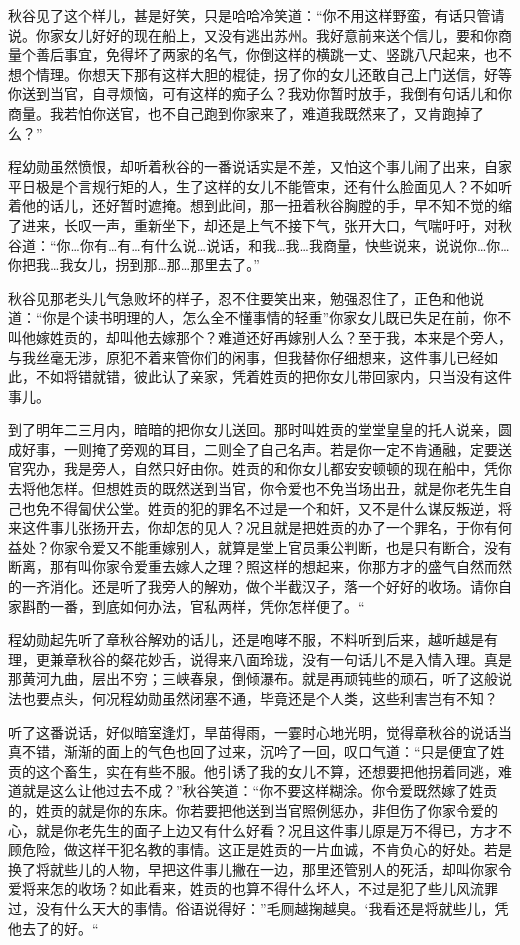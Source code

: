 \documentclass[12pt,UTF8]{ctexbook}
\begin{document}
{{{秋谷见了这个样儿，甚是好笑，只是哈哈冷笑道：“你不用这样野蛮，有话只管请说。你家女儿好好的现在船上，又没有逃出苏州。我好意前来送个信儿，要和你商量个善后事宜，免得坏了两家的名气，你倒这样的横跳一丈、竖跳八尺起来，也不想个情理。你想天下那有这样大胆的棍徒，拐了你的女儿还敢自己上门送信，好等你送到当官，自寻烦恼，可有这样的痴子么？我劝你暂时放手，我倒有句话儿和你商量。我若怕你送官，也不自己跑到你家来了，难道我既然来了，又肯跑掉了么？”

程幼勋虽然愤恨，却听着秋谷的一番说话实是不差，又怕这个事儿闹了出来，自家平日极是个言规行矩的人，生了这样的女儿不能管束，还有什么脸面见人？不如听着他的话儿，还好暂时遮掩。想到此间，那一扭着秋谷胸膛的手，早不知不觉的缩了进来，长叹一声，重新坐下，却还是上气不接下气，张开大口，气喘吁吁，对秋谷道：“你…你有…有…有什么说…说话，和我…我…我商量，快些说来，说说你…你…你把我…我女儿，拐到那…那…那里去了。”

秋谷见那老头儿气急败坏的样子，忍不住要笑出来，勉强忍住了，正色和他说道：“你是个读书明理的人，怎么全不懂事情的轻重”你家女儿既已失足在前，你不叫他嫁姓贡的，却叫他去嫁那个？难道还好再嫁别人么？至于我，本来是个旁人，与我丝毫无涉，原犯不着来管你们的闲事，但我替你仔细想来，这件事儿已经如此，不如将错就错，彼此认了亲家，凭着姓贡的把你女儿带回家内，只当没有这件事儿。

到了明年二三月内，暗暗的把你女儿送回。那时叫姓贡的堂堂皇皇的托人说亲，圆成好事，一则掩了旁观的耳目，二则全了自己名声。若是你一定不肯通融，定要送官究办，我是旁人，自然只好由你。姓贡的和你女儿都安安顿顿的现在船中，凭你去将他怎样。但想姓贡的既然送到当官，你令爱也不免当场出丑，就是你老先生自己也免不得匐伏公堂。姓贡的犯的罪名不过是一个和奸，又不是什么谋反叛逆，将来这件事儿张扬开去，你却怎的见人？况且就是把姓贡的办了一个罪名，于你有何益处？你家令爱又不能重嫁别人，就算是堂上官员秉公判断，也是只有断合，没有断离，那有叫你家令爱重去嫁人之理？照这样的想起来，你那方才的盛气自然而然的一齐消化。还是听了我旁人的解劝，做个半截汉子，落一个好好的收场。请你自家斟酌一番，到底如何办法，官私两样，凭你怎样便了。“

程幼勋起先听了章秋谷解劝的话儿，还是咆哮不服，不料听到后来，越听越是有理，更兼章秋谷的粲花妙舌，说得来八面玲珑，没有一句话儿不是入情入理。真是那黄河九曲，层出不穷；三峡春泉，倒倾瀑布。就是再顽钝些的顽石，听了这般说法也要点头，何况程幼勋虽然闭塞不通，毕竟还是个人类，这些利害岂有不知？

听了这番说话，好似暗室逢灯，旱苗得雨，一霎时心地光明，觉得章秋谷的说话当真不错，渐渐的面上的气色也回了过来，沉吟了一回，叹口气道：“只是便宜了姓贡的这个畜生，实在有些不服。他引诱了我的女儿不算，还想要把他拐着同逃，难道就是这么让他过去不成？”秋谷笑道：“你不要这样糊涂。你令爱既然嫁了姓贡的，姓贡的就是你的东床。你若要把他送到当官照例惩办，非但伤了你家令爱的心，就是你老先生的面子上边又有什么好看？况且这件事儿原是万不得已，方才不顾危险，做这样干犯名教的事情。这正是姓贡的一片血诚，不肯负心的好处。若是换了将就些儿的人物，早把这件事儿撇在一边，那里还管别人的死活，却叫你家令爱将来怎的收场？如此看来，姓贡的也算不得什么坏人，不过是犯了些儿风流罪过，没有什么天大的事情。俗语说得好：”毛厕越掬越臭。‘我看还是将就些儿，凭他去了的好。“

}}}
\end{document}
